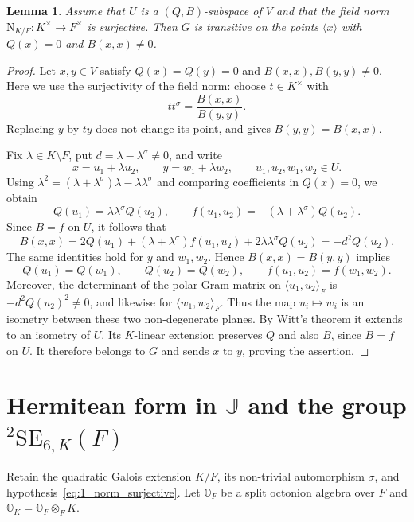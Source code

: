 \documentclass{amsart}
\def\NN{\mathord{\mathrm{N}}}
\def\OO{\mathord{\mathbb{O}}}
\newcommand{\SE}{\mathrm{SE}}
\newcommand{\J}{\mathbb{J}}
\newcommand{\s}{\sigma}
\theoremstyle{plain}
\numberwithin{theorem}{section}
\newtheorem{lemma}[theorem]{Lemma}
\theoremstyle{definition}
\begin{document}
\begin{lemma}
	\label{lemma:3_2forms_nonisotropic}
	Assume that $U$ is a $(Q,B)$-subspace of $V$ and that the field norm
	$\NN_{K/F}:K^{\times}\rightarrow F^{\times}$ is surjective. Then $G$ is
	transitive on the points $\langle x\rangle$ with $Q(x)=0$ and $B(x,x)\neq0$.
\end{lemma}

\begin{proof}
	Let $x,y\in V$ satisfy $Q(x)=Q(y)=0$ and $B(x,x),B(y,y)\neq0$.
	Here we use the surjectivity of the field norm: choose $t\in K^{\times}$ with
	\[
		tt^{\s}=\frac{B(x,x)}{B(y,y)}.
	\]
	Replacing $y$ by $ty$ does not change its point, and gives $B(y,y)=B(x,x)$.

	Fix $\lambda\in K\setminus F$, put $d=\lambda-\lambda^{\s}\neq0$, and write
	\[
		x=u_1+\lambda u_2,\qquad y=w_1+\lambda w_2,
		\qquad u_1,u_2,w_1,w_2\in U.
	\]
	Using $\lambda^2=(\lambda+\lambda^{\s})\lambda-\lambda\lambda^{\s}$
	and comparing coefficients in $Q(x)=0$, we obtain
	\[
		Q(u_1)=\lambda\lambda^{\s}Q(u_2),\qquad
		f(u_1,u_2)=-(\lambda+\lambda^{\s})Q(u_2).
	\]
	Since $B=f$ on $U$, it follows that
	\[
		B(x,x)=2Q(u_1)+(\lambda+\lambda^{\s})f(u_1,u_2)
		       +2\lambda\lambda^{\s}Q(u_2)=-d^2Q(u_2).
	\]
	The same identities hold for $y$ and $w_1,w_2$. Hence $B(x,x)=B(y,y)$
	implies
	\[
		Q(u_1)=Q(w_1),\qquad Q(u_2)=Q(w_2),\qquad
		f(u_1,u_2)=f(w_1,w_2).
	\]
	Moreover, the determinant of the polar Gram matrix on $\langle u_1,u_2\rangle_F$
	is $-d^2Q(u_2)^2\neq0$, and likewise for $\langle w_1,w_2\rangle_F$.
	Thus the map $u_i\mapsto w_i$ is an isometry between these two
	non-degenerate planes. By Witt's theorem it extends to an isometry of $U$.
	Its $K$-linear extension preserves $Q$ and also $B$, since $B=f$ on $U$.
	It therefore belongs to $G$ and sends $x$ to $y$, proving the assertion.
\end{proof}

\section{Hermitean form in $\J$ and the group ${}^2\SE_{6,K}(F)$}

Retain the quadratic Galois extension $K/F$, its non-trivial automorphism
$\sigma$, and hypothesis~\eqref{eq:1_norm_surjective}. Let $\OO_F$ be
a split octonion algebra over $F$ and $\OO_K = \OO_F \otimes_F K$.
\end{document}
